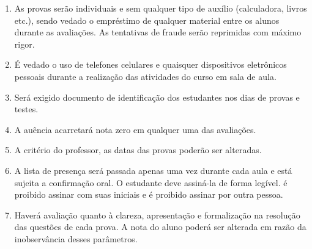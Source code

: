 \documentclass[12pt]{exam}
\begin{document}
\begin{enumerate}[label={\arabic*})]
\item As provas serão individuais e sem qualquer tipo de auxílio (calculadora, livros etc.), sendo vedado o empréstimo de
qualquer material entre os alunos durante as avaliações. As tentativas de fraude serão reprimidas com máximo rigor.

\item É vedado o uso de telefones celulares e quaisquer dispositivos eletrônicos pessoais durante a realização das atividades do curso
em sala de aula.

\item Será exigido documento de identificação dos estudantes nos dias de provas e testes.

\item A auência acarretará nota zero em qualquer uma das avaliações.

\item A critério do professor, as datas das provas poderão ser alteradas.

\item A lista de presença será passada apenas uma vez durante cada aula e está sujeita a confirmação oral. O
estudante deve assiná-la de forma legível. {é} proibido assinar com suas iniciais e é proibido assinar por outra pessoa.

\item Haverá avaliação quanto à clareza, apresentação e formalização na  resolução das questões de cada prova. A nota do aluno poderá ser alterada em razão da
inobservância desses parâmetros.
\end{enumerate}
\end{document}
